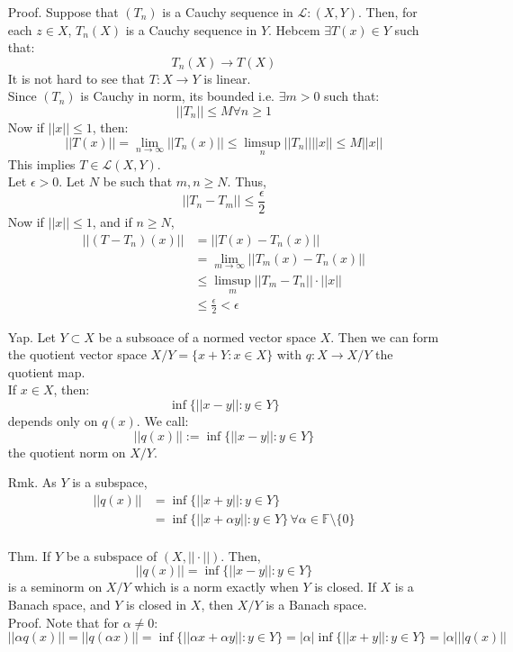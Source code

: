 \documentclass[12pt]{article}
\begin{document}
\begin{itemize}
    Proof. Suppose that $(T_n)$ is a Cauchy sequence in $\mathcal{L:}(X,Y)$. Then, for each $z \in X$, $T_n(X)$ is a Cauchy sequence in $Y$. Hebcem $\exists T(x) \in Y$ such that:
    \[ T_n(X) \to T(X) \]
    It is not hard to see that $T: X \to Y$ is linear. \\
    Since $(T_n)$ is Cauchy in norm, its bounded i.e. $\exists m > 0$ such that:
    \[||T_n|| \leq M \forall n \geq 1 \]
    Now if $||x|| \leq 1$, then:
    \[ ||T(x)|| = \lim_{n\to \infty} ||T_n(x)|| \leq \limsup_{n} ||T_n|| ||x|| \leq M||x||\]
    This implies $T \in \mathcal{L}(X,Y)$. \\
    Let $\epsilon > 0$. Let $N$ be such that $m, n \geq N$. Thus, 
    \[ ||T_n - T_m|| \leq \frac{\epsilon}{2} \]
    Now if $||x|| \leq 1$, and if $n \geq N$, 
    \begin{align*}
        ||(T-T_n)(x)|| & = ||T(x) - T_n(x)|| \\
        &= \lim_{m\to \infty} ||T_m(x) - T_n(x)|| \\
        &\leq \limsup_{m} ||T_m - T_n|| \cdot ||x|| \\
        &\leq \frac{\epsilon}{2} < \epsilon
    \end{align*}
    \item[Yap.] Let $Y \subset X$ be a subsoace of a normed vector space $X$. Then we can form the quotient vector space $X / Y = \{x +Y : x\in X\}$ with $q: X \to X/Y$ the quotient map. \\
    If $x \in X$, then: 
     \[ \inf \{||x-y|| : y \in Y\} \] 
    depends only on $q(x)$. We call: 
    \[||q(x)|| := \inf\{||x-y|| : y \in Y\}\]
    the quotient norm on $X/Y$.
    \item[Rmk.] As $Y$ is a subspace, 
    \begin{align*}
        ||q(x)|| &= \inf\{||x+y|| : y \in Y\} \\
        &= \inf\{||x+\alpha y|| : y \in Y\} \, \forall \alpha \in \mathbb{F}\setminus\{0\}\\
    \end{align*}
    \item[Thm.] If $Y$ be a subspace of $(X, ||\cdot||)$. Then, 
    \[ ||q(x)|| = \inf\{||x-y|| : y \in Y\} \]
    is a seminorm on $X/Y$ which is a norm exactly when $Y$ is closed. If $X$ is a Banach space, and $Y$ is closed in $X$, then $X/Y$ is a Banach space. \\
    Proof. Note that for $\alpha \neq 0$: 
    \[ ||\alpha q(x) || = || q(\alpha x) || = \inf \{||\alpha x + \alpha y|| : y \in Y\} = |\alpha| \inf\{||x+y||: y \in Y\} = |\alpha|||q(x)||\]

\end{itemize}
\end{document}
